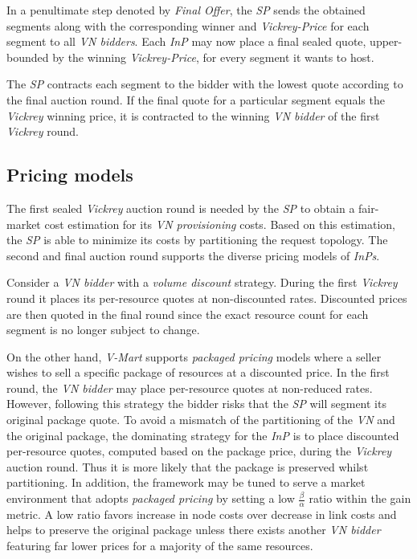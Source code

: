 \documentclass[prodmode,acmtomccap]{acmlarge}
\begin{document}
In a penultimate step denoted by \emph{Final Offer}, the \emph{SP} sends the obtained segments along with the corresponding winner and \emph{Vickrey-Price} for each segment to all \emph{VN bidders}.
Each \emph{InP} may now place a final sealed quote, upper-bounded by the winning \emph{Vickrey-Price}, for every segment it wants to host.

The \emph{SP} contracts each segment to the bidder with the lowest quote according to the final auction round. If the final quote for a particular segment equals the \emph{Vickrey} winning price, it is contracted to
the winning \emph{VN bidder} of the first \emph{Vickrey} round.

\subsection{Pricing models}
The first sealed \emph{Vickrey} auction round is needed by the \emph{SP} to obtain a fair-market cost estimation for its \emph{VN provisioning} costs. 
Based on this estimation, the \emph{SP} is able to minimize its costs by partitioning the request topology.
The second and final auction round supports the diverse pricing models of \emph{InPs}.

Consider a \emph{VN bidder} with a \emph{volume discount} strategy. During the first \emph{Vickrey} round it places its per-resource quotes at non-discounted rates.
Discounted prices are then quoted in the final round since the exact resource count for each segment is no longer subject to change.

On the other hand, \emph{V-Mart} supports \emph{packaged pricing} models where a seller wishes to sell a specific package of resources at a discounted price.
In the first round, the \emph{VN bidder} may place per-resource quotes at non-reduced rates. However, following this strategy the bidder risks that the \emph{SP}
will segment its original package quote. To avoid a mismatch of the partitioning of the \emph{VN} and the original package, the dominating strategy for the \emph{InP}
is to place discounted per-resource quotes, computed based on the package price, during the \emph{Vickrey} auction round. Thus it is more likely that the package is preserved
whilst partitioning. In addition, the framework may be tuned to serve a market environment that adopts \emph{packaged pricing} by
setting a low $\frac{\beta}{\alpha}$ ratio within the gain metric. A low ratio favors increase in node costs over decrease in link costs and helps to preserve the original package unless there
exists another \emph{VN bidder} featuring far lower prices for a majority of the same resources.
\end{document}
